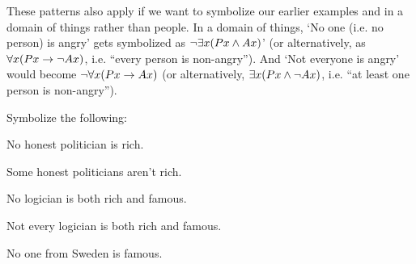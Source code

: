 These patterns also apply if we want to symbolize our earlier examples  and  in a domain of things rather than people.  In a domain of things, `No one (i.e. no person) is angry' gets symbolized as $\neg \exists x(Px \wedge Ax)$' (or alternatively, as $\forall x(Px \rightarrow \neg Ax)$, i.e. ``every person is non-angry'').  And `Not everyone is angry' would become $\neg \forall x(Px \rightarrow Ax)$ (or alternatively, $\exists x(Px \wedge \neg Ax)$, i.e. ``at least one person is non-angry'').


\practiceproblems
\problempart Symbolize the following: 

\begin{earg}

\item No honest politician is rich.

\item Some honest politicians aren't rich.

\item No logician is both rich and famous.

\item Not every logician is both rich and famous.

\item No one from Sweden is famous.

\end{earg}



